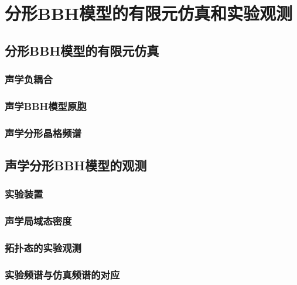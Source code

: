 \chapter{分形BBH模型的有限元仿真和实验观测}

\section{分形BBH模型的有限元仿真}
\subsection{声学负耦合}
\subsection{声学BBH模型原胞}
\subsection{声学分形晶格频谱}

\section{声学分形BBH模型的观测}
\subsection{实验装置}
\subsection{声学局域态密度}
\subsection{拓扑态的实验观测}
\subsection{实验频谱与仿真频谱的对应}
